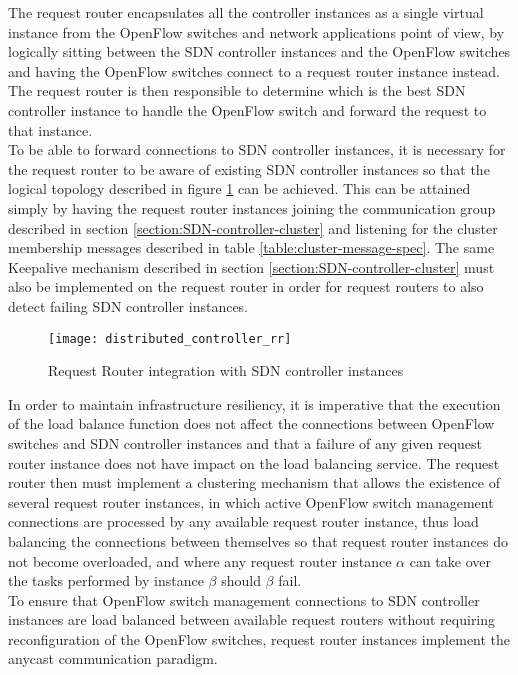 %
The request router encapsulates all the controller instances as a single virtual instance from the OpenFlow switches and network applications point of view, by logically sitting between the \gls{SDN} controller instances and the OpenFlow switches and having the OpenFlow switches connect to a request router instance instead.
The request router is then responsible to determine which is the best \gls{SDN} controller instance to handle the OpenFlow switch and forward the request to that instance.\\
%
To be able to forward connections to \gls{SDN} controller instances, it is necessary for the request router to be aware of existing \gls{SDN} controller instances so that the logical topology described in figure \ref{fig:distributed_controller_rr} can be achieved.
This can be attained simply by having the request router instances joining the communication group described in section \ref{section:SDN-controller-cluster} and listening for the cluster membership messages described in table \ref{table:cluster-message-spec}.
The same \gls{Keepalive} mechanism described in section \ref{section:SDN-controller-cluster} must also be implemented on the request router in order for request routers to also detect failing \gls{SDN} controller instances.\\
%
\begin{figure}
	\centering
	\texttt{[image: distributed\_controller\_rr]}
	\caption{Request Router integration with \gls{SDN} controller instances}
	\label{fig:distributed_controller_rr}
\end{figure}
%
In order to maintain infrastructure resiliency, it is imperative that the execution of the load balance function does not affect the connections between OpenFlow switches and \gls{SDN} controller instances and that a failure of any given request router instance does not have impact on the load balancing service.
The request router then must implement a clustering mechanism that allows the existence of several request router instances, in which active OpenFlow switch management connections are processed by any available request router instance, thus load balancing the connections between themselves so that request router instances do not become overloaded, and where any request router instance $\alpha$ can take over the tasks performed by instance $\beta$ should $\beta$ fail.\\
To ensure that OpenFlow switch management connections to \gls{SDN} controller instances are load balanced between available request routers without requiring reconfiguration of the OpenFlow switches, request router instances implement the \gls{anycast} communication paradigm.
